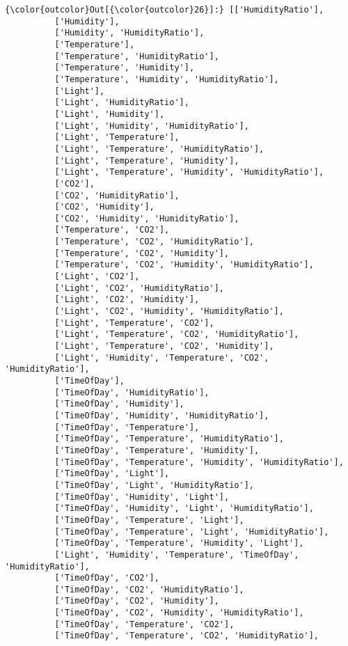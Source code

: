\documentclass[11pt]{article}
\begin{document}
\begin{Verbatim}[commandchars=\\\{\}]
{\color{outcolor}Out[{\color{outcolor}26}]:} [['HumidityRatio'],
          ['Humidity'],
          ['Humidity', 'HumidityRatio'],
          ['Temperature'],
          ['Temperature', 'HumidityRatio'],
          ['Temperature', 'Humidity'],
          ['Temperature', 'Humidity', 'HumidityRatio'],
          ['Light'],
          ['Light', 'HumidityRatio'],
          ['Light', 'Humidity'],
          ['Light', 'Humidity', 'HumidityRatio'],
          ['Light', 'Temperature'],
          ['Light', 'Temperature', 'HumidityRatio'],
          ['Light', 'Temperature', 'Humidity'],
          ['Light', 'Temperature', 'Humidity', 'HumidityRatio'],
          ['CO2'],
          ['CO2', 'HumidityRatio'],
          ['CO2', 'Humidity'],
          ['CO2', 'Humidity', 'HumidityRatio'],
          ['Temperature', 'CO2'],
          ['Temperature', 'CO2', 'HumidityRatio'],
          ['Temperature', 'CO2', 'Humidity'],
          ['Temperature', 'CO2', 'Humidity', 'HumidityRatio'],
          ['Light', 'CO2'],
          ['Light', 'CO2', 'HumidityRatio'],
          ['Light', 'CO2', 'Humidity'],
          ['Light', 'CO2', 'Humidity', 'HumidityRatio'],
          ['Light', 'Temperature', 'CO2'],
          ['Light', 'Temperature', 'CO2', 'HumidityRatio'],
          ['Light', 'Temperature', 'CO2', 'Humidity'],
          ['Light', 'Humidity', 'Temperature', 'CO2', 'HumidityRatio'],
          ['TimeOfDay'],
          ['TimeOfDay', 'HumidityRatio'],
          ['TimeOfDay', 'Humidity'],
          ['TimeOfDay', 'Humidity', 'HumidityRatio'],
          ['TimeOfDay', 'Temperature'],
          ['TimeOfDay', 'Temperature', 'HumidityRatio'],
          ['TimeOfDay', 'Temperature', 'Humidity'],
          ['TimeOfDay', 'Temperature', 'Humidity', 'HumidityRatio'],
          ['TimeOfDay', 'Light'],
          ['TimeOfDay', 'Light', 'HumidityRatio'],
          ['TimeOfDay', 'Humidity', 'Light'],
          ['TimeOfDay', 'Humidity', 'Light', 'HumidityRatio'],
          ['TimeOfDay', 'Temperature', 'Light'],
          ['TimeOfDay', 'Temperature', 'Light', 'HumidityRatio'],
          ['TimeOfDay', 'Temperature', 'Humidity', 'Light'],
          ['Light', 'Humidity', 'Temperature', 'TimeOfDay', 'HumidityRatio'],
          ['TimeOfDay', 'CO2'],
          ['TimeOfDay', 'CO2', 'HumidityRatio'],
          ['TimeOfDay', 'CO2', 'Humidity'],
          ['TimeOfDay', 'CO2', 'Humidity', 'HumidityRatio'],
          ['TimeOfDay', 'Temperature', 'CO2'],
          ['TimeOfDay', 'Temperature', 'CO2', 'HumidityRatio'],

\end{Verbatim}
\end{document}
